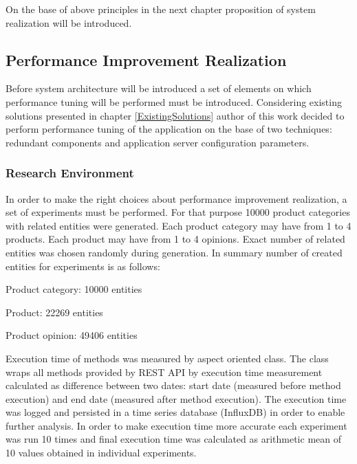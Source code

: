 \documentclass[12pt,a4paper]{article}
\let\tempone\itemize
\let\temptwo\enditemize
\renewenvironment{itemize}{\tempone\addtolength{\itemsep}{-0.4\baselineskip}}{\temptwo}
\begin{document}
On the base of above principles in the next chapter proposition of system realization will be introduced.  

\subsection{Performance Improvement Realization} \label{realization}

Before system architecture will be introduced a set of elements on which performance tuning will be performed must be introduced.  
Considering existing solutions presented in chapter \ref{ExistingSolutions} author of this work decided to perform performance tuning of the application on the base of two techniques: redundant components and application server configuration parameters. 

\subsubsection{Research Environment}

In order to make the right choices about performance improvement realization, a set of experiments must be performed. 
For that purpose 10000 product categories with related entities were generated. Each product category may have from 1 to 4 products. Each product may have from 1 to 4 opinions. Exact number of related entities was chosen randomly during generation. In summary number of created entities for experiments is as follows:
\begin{itemize}
\item Product category: 10000 entities
\item Product: 22269 entities
\item Product opinion: 49406 entities
\end{itemize}  

Execution time of methods was measured by aspect oriented class. The class wraps all methods provided by REST API by execution time measurement calculated as difference between two dates: start date (measured before method execution) and end date (measured after method execution). The execution time was logged and persisted in a time series database (InfluxDB) in order to enable further analysis. In order to make execution time more accurate each experiment was run 10 times and final execution time was calculated as arithmetic mean of 10 values obtained in individual experiments. 
\end{document}

